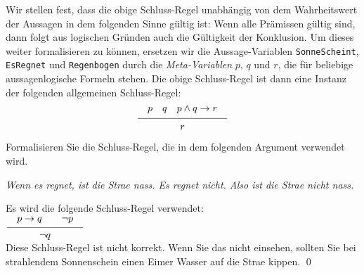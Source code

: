  Wir stellen fest, dass die obige Schluss-Regel unabh\"{a}ngig von dem Wahrheitswert der Aussagen in dem folgenden Sinne
g\"{u}ltig ist: Wenn alle Pr\"{a}missen g\"{u}ltig sind, dann folgt aus logischen Gr\"{u}nden auch die G\"{u}ltigkeit der Konklusion.
 Um dieses weiter formalisieren zu k\"{o}nnen, ersetzen wir die Aussage-Variablen
 \texttt{SonneScheint}, \texttt{EsRegnet} und \texttt{Regenbogen} durch die
 \emph{Meta-Variablen} $p$, $q$ und $r$, die f\"{u}r beliebige aussagenlogische Formeln stehen.
  Die obige Schluss-Regel ist dann eine Instanz der folgenden allgemeinen Schluss-Regel:
$$ \schluss{p \quad q \quad p \wedge q \rightarrow r}{r}  $$

\exercise
Formalisieren Sie die Schluss-Regel, die in dem folgenden Argument verwendet wird.
\begin{center}
\begin{minipage}[c]{7.9cm}
\textsl{Wenn es regnet, ist die Stra\3e nass.  Es regnet nicht.  Also ist die Stra\3e nicht nass. \eox} 
\end{minipage}  
\end{center}

\solution
Es wird die folgende Schluss-Regel verwendet: \\[0.2cm]
\hspace*{1.3cm} $\schluss{p \rightarrow q \quad\quad \neg p}{\neg q}$\\[0.2cm]
Diese Schluss-Regel ist nicht korrekt.  Wenn Sie das nicht einsehen, sollten Sie bei strahlendem Sonnenschein einen Eimer Wasser
auf die Stra\3e kippen.  \qed
\vspace*{0.1cm}

